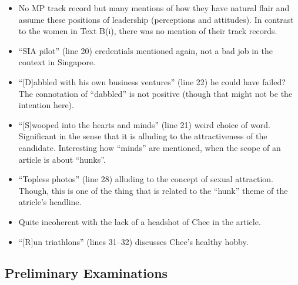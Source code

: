 \documentclass[../main.tex]{subfiles}
\begin{document}
\begin{itemize}
\begin{itemize}
						\item No MP track record but many mentions of how they have natural flair and assume these positions of leadership (perceptions and attitudes). In contrast to the women in Text B(i), there was no mention of their track records.
						\item ``SIA pilot'' (line 20) credentials mentioned again, not a bad job in the context in Singapore. 
						\item ``[D]abbled with his own business ventures'' (line 22) he could have failed? The connotation of ``dabbled'' is not positive (though that might not be the intention here).
						\item ``[S]wooped into the hearts and minds'' (line 21) weird choice of word. Significant in the sense that it is alluding to the attractiveness of the candidate. Interesting how ``minds'' are mentioned, when the scope of an article is about ``hunks''.
						\item ``Topless photos'' (line 28) alluding to the concept of sexual attraction. Though, this is one of the thing that is related to the ``hunk'' theme of the atricle's headline.
						\item Quite incoherent with the lack of a headshot of Chee in the article.
						\item ``[R]un triathlons'' (lines 31--32) discusses Chee's healthy hobby.
					\end{itemize}
				\end{itemize}

		\subsection*{Preliminary Examinations}
\end{document}
